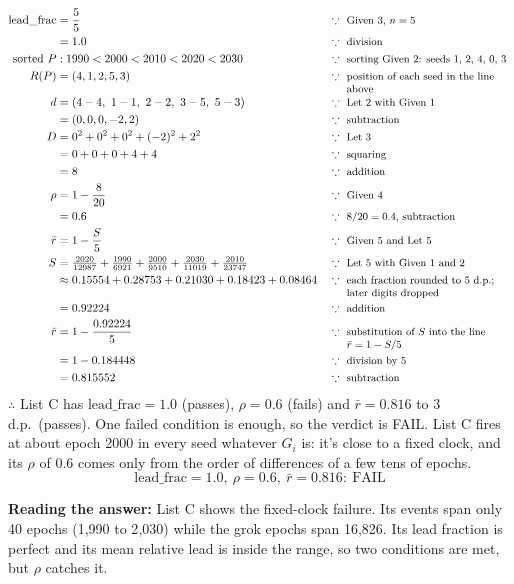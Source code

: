 \documentclass[11pt,a4paper,oneside,openany]{report}
\newcommand{\leadfrac}{\mathrm{lead\_frac}}
\newcommand{\rbar}{\bar{r}}
\newcommand{\why}[1]{\because\ \parbox[t]{5.0cm}{\raggedright\small #1}}
\newcommand{\fans}{\par\textbf{Reading the answer:} }
\begin{document}
\begin{align*}
\leadfrac &= \frac{5}{5} && \why{Given 3, $n = 5$} \\
          &= 1.0 && \why{division} \\
\text{sorted } P &: 1990 < 2000 < 2010 < 2020 < 2030 && \why{sorting Given 2: seeds 1, 2, 4, 0, 3} \\
R(P) &= (4, 1, 2, 5, 3) && \why{position of each seed in the line above} \\
d &= (4-4,\ 1-1,\ 2-2,\ 3-5,\ 5-3) && \why{Let 2 with Given 1} \\
  &= (0, 0, 0, -2, 2) && \why{subtraction} \\
D &= 0^2 + 0^2 + 0^2 + (-2)^2 + 2^2 && \why{Let 3} \\
  &= 0 + 0 + 0 + 4 + 4 && \why{squaring} \\
  &= 8 && \why{addition} \\
\rho &= 1 - \frac{8}{20} && \why{Given 4} \\
     &= 0.6 && \why{$8/20 = 0.4$, subtraction} \\
\rbar &= 1 - \frac{S}{5} && \why{Given 5 and Let 5} \\
S &= \tfrac{2020}{12987} + \tfrac{1990}{6921} + \tfrac{2000}{9510} + \tfrac{2030}{11019} + \tfrac{2010}{23747} && \why{Let 5 with Given 1 and 2} \\
  &\approx 0.15554 + 0.28753 + 0.21030 + 0.18423 + 0.08464 && \why{each fraction rounded to 5 d.p.; later digits dropped} \\
  &= 0.92224 && \why{addition} \\
\rbar &= 1 - \frac{0.92224}{5} && \why{substitution of $S$ into the line $\rbar = 1 - S/5$} \\
      &= 1 - 0.184448 && \why{division by 5} \\
      &= 0.815552 && \why{subtraction}
\end{align*}
$\therefore$ List C has $\leadfrac = 1.0$ (passes), $\rho = 0.6$ (fails) and $\rbar = 0.816$ to 3 d.p.\ (passes). One failed condition is enough, so the verdict is FAIL. List C fires at about epoch 2000 in every seed whatever $G_i$ is: it's close to a fixed clock, and its $\rho$ of 0.6 comes only from the order of differences of a few tens of epochs.
\[\boxed{\leadfrac = 1.0, \ \rho = 0.6, \ \rbar = 0.816: \ \text{FAIL}}\]

\fans List C shows the fixed-clock failure. Its events span only 40 epochs (1{,}990 to 2{,}030) while the grok epochs span 16{,}826. Its lead fraction is perfect and its mean relative lead is inside the range, so two conditions are met, but $\rho$ catches it.
\end{document}
